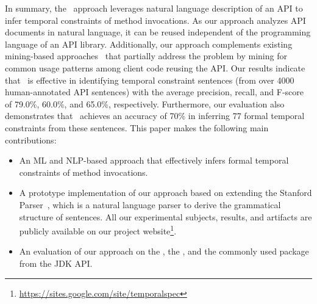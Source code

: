 In summary, the \tool\ approach leverages natural language description of an API to infer temporal constraints of method invocations.
As our approach analyzes API documents in natural language, it can be reused independent of the programming language of an API library.
Additionally, our approach complements existing mining-based approaches~\cite{buse2012synthesizing, thummalapenta07parseweb, Wang:2013:MSR, Zhong:2009:MMR} that partially address the problem by mining for common usage patterns among client code reusing the API.
Our results indicate that \tool\ is effective in identifying temporal
constraint sentences (from over
4000 human-annotated API sentences) with the average precision, recall, and F-score
of 79.0\%, 60.0\%, and 65.0\%, respectively.
Furthermore, our evaluation also demonstrates that \tool\ achieves an accuracy of 70\% in inferring 77 formal temporal constraints from these sentences.
This paper makes the following main contributions:


\begin{itemize}
	\item An ML and NLP-based approach that effectively infers formal temporal constraints of method invocations. 
	\item A prototype implementation of our approach based on extending the Stanford Parser~\cite{Klein03}, which is a natural language parser to derive the grammatical structure of sentences.
	All our experimental subjects, results, and artifacts are publicly available on our project website\footnote{\url{https://sites.google.com/site/temporalspec}}. 
	\item An evaluation of our approach on the \amazonAPI, the \paypalAPI, and the commonly used package  from the JDK API. 
\end{itemize}



